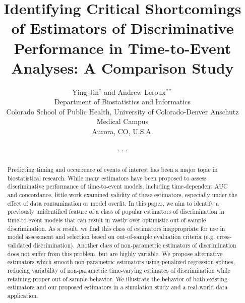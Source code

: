 \documentclass[useAMS,usenatbib, referee]{biom}
\title[]{Identifying Critical Shortcomings of Estimators of Discriminative Performance in Time-to-Event Analyses: A Comparison Study}
\author{Ying Jin$^{*}$\email{ying.jin@cuanschutz.edu} and
Andrew Leroux$^{**}$\email{andrew.leroux@cuanschutz.edu} \\
Department of Biostatistics and Informatics\\Colorado School of Public Health, 
University of Colorado-Denver Anschutz Medical Campus\\Aurora, CO, U.S.A.}
\begin{document}

\date{{\it} . {\it } .  {\it
}.}



\pagerange{\pageref{firstpage}--\pageref{lastpage}} 
\volume{}
\pubyear{}
\artmonth{}


\doi{}


\label{firstpage}


\begin{abstract}
Predicting timing and occurrence of events of interest has been a major topic in biostatistical
research. While many estimators have been proposed to assess discriminative performance of time-to-event models, including time-dependent AUC and concordance, little work examined validity of these estimators, especially under the effect of data contamination or model overfit. In this paper, we aim to identify a previously unidentified feature of a class of popular estimators of discrimination in time-to-event models that can result in vastly over-optimistic out-of-sample discrimination. As a result, we find this class of estimators inappropriate for use in model assessment and selection based on out-of-sample evaluation criteria (e.g. cross-validated discrimination). Another class of non-parametric estimators of discrimination does not suffer from this problem, but are highly variable. We propose alternative estimators which smooth non-parametric estimators using penalized regression splines, reducing variability of non-parametric time-varying estimates of discrimination while retaining proper out-of-sample behavior. We illustrate the behavior of both existing estimators and our proposed estimators in a simulation study and a real-world data application. 
\end{abstract}
\end{document}

